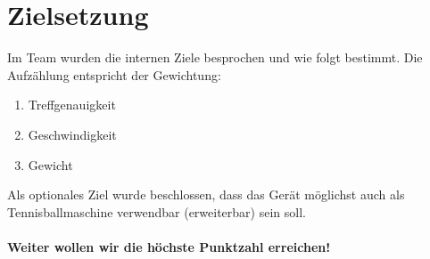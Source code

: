 \section{Zielsetzung}
Im Team wurden die internen Ziele besprochen und wie folgt bestimmt. Die Aufzählung entspricht der Gewichtung:
\begin{enumerate}
\item Treffgenauigkeit
\item Geschwindigkeit
\item Gewicht
\end{enumerate}
Als optionales Ziel wurde beschlossen, dass das Gerät möglichst auch als Tennisballmaschine verwendbar (erweiterbar)
sein soll.\\
\\
\textbf{Weiter wollen wir die höchste Punktzahl erreichen!}
